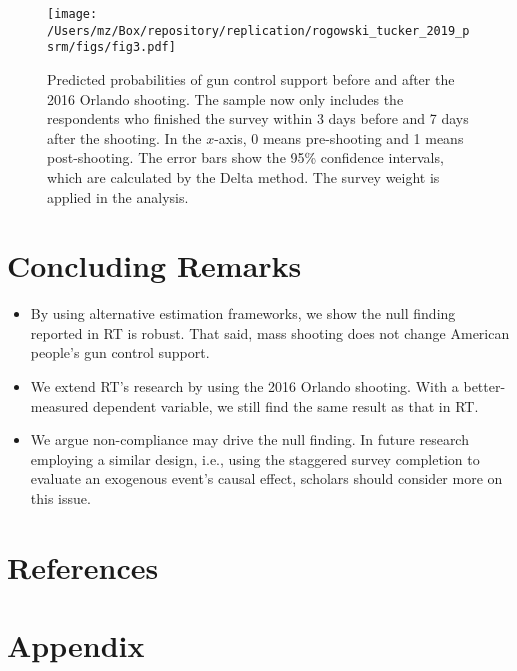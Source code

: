 \documentclass[11pt]{article}
\begin{document}
\begin{figure}[htbp!]
    \centering
    \label{fig3}
    \texttt{[image: /Users/mz/Box/repository/replication/rogowski\_tucker\_2019\_psrm/figs/fig3.pdf]}
    \captionsetup{justification = raggedright, singlelinecheck = false}
    \caption{Predicted probabilities of gun control support before and after the 2016 Orlando shooting. The sample now only includes the respondents who finished the survey within 3 days before and 7 days after the shooting. In the \(x\)-axis, 0 means pre-shooting and 1 means post-shooting. The error bars show the 95\% confidence intervals, which are calculated by the Delta method. The survey weight is applied in the analysis.}
\end{figure}

\clearpage
\section*{Concluding Remarks}
\begin{itemize}
    \item By using alternative estimation frameworks, we show the null finding reported in RT is robust. That said, mass shooting does not change American people’s gun control support.
    \item We extend RT’s research by using the 2016 Orlando shooting. With a better-measured dependent variable, we still find the same result as that in RT.
    \item We argue non-compliance may drive the null finding. In future research employing a similar design, i.e., using the staggered survey completion to evaluate an exogenous event’s causal effect, scholars should consider more on this issue.
\end{itemize}

\newpage
\section*{References}
\begingroup
{}
\setlength\bibitemsep{0pt}
\printbibliography[heading = none]
\endgroup

\newpage
\section*{Appendix}






\end{document}
